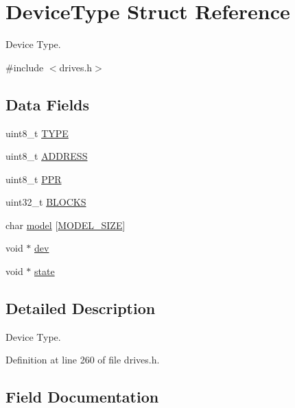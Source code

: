 \hypertarget{structDeviceType}{}\section{Device\+Type Struct Reference}
\label{structDeviceType}


Device Type.  




{\ttfamily \#include $<$drives.\+h$>$}

\subsection*{Data Fields}
\begin{DoxyCompactItemize}
\item 
uint8\+\_\+t \hyperlink{structDeviceType_acee5219162b6f47a9423b2086d127ede}{T\+Y\+PE}
\item 
uint8\+\_\+t \hyperlink{structDeviceType_a62529b7435785e39e8e7c5019303c2dd}{A\+D\+D\+R\+E\+SS}
\item 
uint8\+\_\+t \hyperlink{structDeviceType_ae0e59c6c17582ff80bdab3f2010e8d57}{P\+PR}
\item 
uint32\+\_\+t \hyperlink{structDeviceType_a29cbf84a3e9c8d01c8c77023ebf9c1f5}{B\+L\+O\+C\+KS}
\item 
char \hyperlink{structDeviceType_a47798e475b578d09f024fd983c69dfb6}{model} \mbox{[}\hyperlink{drives_8h_a3f11d81c1e6d925611a9bdd5115064a0}{M\+O\+D\+E\+L\+\_\+\+S\+I\+ZE}\mbox{]}
\item 
void $\ast$ \hyperlink{structDeviceType_a59fc3b3cb45f8ee0cd1016bd64804d3b}{dev}
\item 
void $\ast$ \hyperlink{structDeviceType_ad0fc43d63606bab6c259047e36512e08}{state}
\end{DoxyCompactItemize}


\subsection{Detailed Description}
Device Type. 

Definition at line 260 of file drives.\+h.



\subsection{Field Documentation}
\mbox{\label{structDeviceType_a62529b7435785e39e8e7c5019303c2dd}} 
